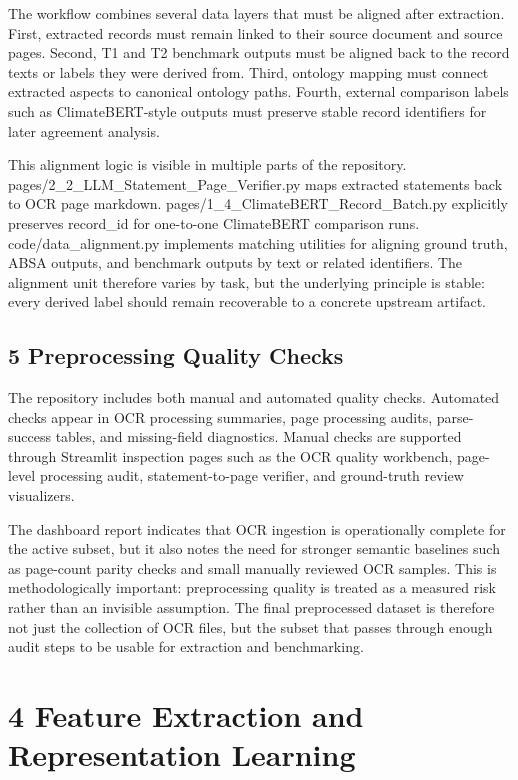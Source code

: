 The workflow combines several data layers that must be aligned after extraction. First, extracted records must remain linked to their source document and source pages. Second, T1 and T2 benchmark outputs must be aligned back to the record texts or labels they were derived from. Third, ontology mapping must connect extracted aspects to canonical ontology paths. Fourth, external comparison labels such as ClimateBERT-style outputs must preserve stable record identifiers for later agreement analysis.

This alignment logic is visible in multiple parts of the repository. pages/2\_2\_LLM\_Statement\_Page\_Verifier.py maps extracted statements back to OCR page markdown. pages/1\_4\_ClimateBERT\_Record\_Batch.py explicitly preserves record\_id for one-to-one ClimateBERT comparison runs. code/data\_alignment.py implements matching utilities for aligning ground truth, ABSA outputs, and benchmark outputs by text or related identifiers. The alignment unit therefore varies by task, but the underlying principle is stable: every derived label should remain recoverable to a concrete upstream artifact.

\subsection{5 Preprocessing Quality Checks}

The repository includes both manual and automated quality checks. Automated checks appear in OCR processing summaries, page processing audits, parse-success tables, and missing-field diagnostics. Manual checks are supported through Streamlit inspection pages such as the OCR quality workbench, page-level processing audit, statement-to-page verifier, and ground-truth review visualizers.

The dashboard report indicates that OCR ingestion is operationally complete for the active subset, but it also notes the need for stronger semantic baselines such as page-count parity checks and small manually reviewed OCR samples. This is methodologically important: preprocessing quality is treated as a measured risk rather than an invisible assumption. The final preprocessed dataset is therefore not just the collection of OCR files, but the subset that passes through enough audit steps to be usable for extraction and benchmarking.

\section{4 Feature Extraction and Representation Learning}

